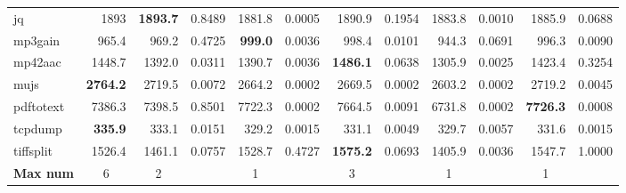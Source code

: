 \documentclass[lettersize,journal]{IEEEtran}
\begin{document}
\begin{table}[t!]
\begin{tabular}{lccccccccccr}
		jq    & \multicolumn{1}{r}{1893} & \multicolumn{1}{r}{\textbf{1893.7 }} & \multicolumn{1}{r}{0.8489 } & \multicolumn{1}{r}{1881.8 } & \multicolumn{1}{r}{0.0005 } & \multicolumn{1}{r}{1890.9 } & \multicolumn{1}{r}{0.1954 } & \multicolumn{1}{r}{1883.8 } & \multicolumn{1}{r}{0.0010 } & \multicolumn{1}{r}{1885.9 } & 0.0688  \\
		mp3gain & \multicolumn{1}{r}{965.4} & \multicolumn{1}{r}{969.2 } & \multicolumn{1}{r}{0.4725 } & \multicolumn{1}{r}{\textbf{999.0 }} & \multicolumn{1}{r}{0.0036 } & \multicolumn{1}{r}{998.4 } & \multicolumn{1}{r}{0.0101 } & \multicolumn{1}{r}{944.3 } & \multicolumn{1}{r}{0.0691 } & \multicolumn{1}{r}{996.3 } & 0.0090  \\
		mp42aac & \multicolumn{1}{r}{1448.7} & \multicolumn{1}{r}{1392.0 } & \multicolumn{1}{r}{0.0311 } & \multicolumn{1}{r}{1390.7 } & \multicolumn{1}{r}{0.0036 } & \multicolumn{1}{r}{\textbf{1486.1 }} & \multicolumn{1}{r}{0.0638 } & \multicolumn{1}{r}{1305.9 } & \multicolumn{1}{r}{0.0025 } & \multicolumn{1}{r}{1423.4 } & 0.3254  \\
		mujs  & \multicolumn{1}{r}{\textbf{2764.2}} & \multicolumn{1}{r}{2719.5 } & \multicolumn{1}{r}{0.0072 } & \multicolumn{1}{r}{2664.2 } & \multicolumn{1}{r}{0.0002 } & \multicolumn{1}{r}{2669.5 } & \multicolumn{1}{r}{0.0002 } & \multicolumn{1}{r}{2603.2 } & \multicolumn{1}{r}{0.0002 } & \multicolumn{1}{r}{2719.2 } & 0.0045  \\
		pdftotext & \multicolumn{1}{r}{7386.3} & \multicolumn{1}{r}{7398.5 } & \multicolumn{1}{r}{0.8501 } & \multicolumn{1}{r}{7722.3 } & \multicolumn{1}{r}{0.0002 } & \multicolumn{1}{r}{7664.5 } & \multicolumn{1}{r}{0.0091 } & \multicolumn{1}{r}{6731.8 } & \multicolumn{1}{r}{0.0002 } & \multicolumn{1}{r}{\textbf{7726.3 }} & 0.0008  \\
		tcpdump & \multicolumn{1}{r}{\textbf{335.9}} & \multicolumn{1}{r}{333.1 } & \multicolumn{1}{r}{0.0151 } & \multicolumn{1}{r}{329.2 } & \multicolumn{1}{r}{0.0015 } & \multicolumn{1}{r}{331.1 } & \multicolumn{1}{r}{0.0049 } & \multicolumn{1}{r}{329.7 } & \multicolumn{1}{r}{0.0057 } & \multicolumn{1}{r}{331.6 } & 0.0015  \\
		tiffsplit & \multicolumn{1}{r}{1526.4} & \multicolumn{1}{r}{1461.1 } & \multicolumn{1}{r}{0.0757 } & \multicolumn{1}{r}{1528.7 } & \multicolumn{1}{r}{0.4727 } & \multicolumn{1}{r}{\textbf{1575.2 }} & \multicolumn{1}{r}{0.0693 } & \multicolumn{1}{r}{1405.9 } & \multicolumn{1}{r}{0.0036 } & \multicolumn{1}{r}{1547.7 } & 1.0000  \\
		\midrule
		\textbf{Max num} & 6     & 2     &       & 1     &       & 3     &       & 1     &       & 1     &  \\
		\bottomrule
	\end{tabular}%
	\label{tab:edge_coverage}%
\end{table}%
\end{document}
